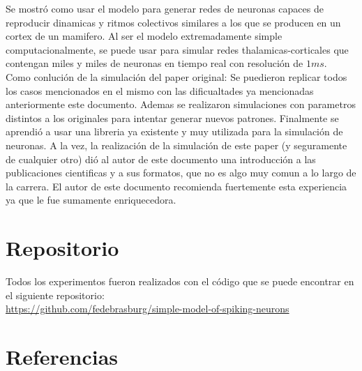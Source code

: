 \documentclass[12pt]{article}
\begin{document}
Se mostró como usar el modelo para generar redes de neuronas capaces de reproducir dinamicas y ritmos colectivos similares a los que se producen en un cortex de un mamifero.
Al ser el modelo extremadamente simple computacionalmente, se puede usar para simular redes thalamicas-corticales que contengan miles y miles de neuronas en tiempo real con resolución de $1 ms$. \\

Como conlución de la simulación del paper original: Se puedieron replicar todos los casos mencionados en el mismo con las dificualtades ya mencionadas anteriormente este documento.
Ademas se realizaron simulaciones con parametros distintos a los originales para intentar generar nuevos patrones.
Finalmente se aprendió a usar una libreria ya existente y muy utilizada para la simulación de neuronas.
A la vez, la realización de la simulación de este paper (y seguramente de cualquier otro) dió al autor de este documento una introducción a las publicaciones cientificas y a sus formatos, que no es algo muy comun
a lo largo de la carrera.
El autor de este documento recomienda fuertemente esta experiencia ya que le fue sumamente enriquecedora.

\section{Repositorio}
Todos los experimentos fueron realizados con el código que se puede encontrar en el siguiente repositorio: \\
\url{https://github.com/fedebrasburg/simple-model-of-spiking-neurons}

\newpage

\section{Referencias}
\end{document}
